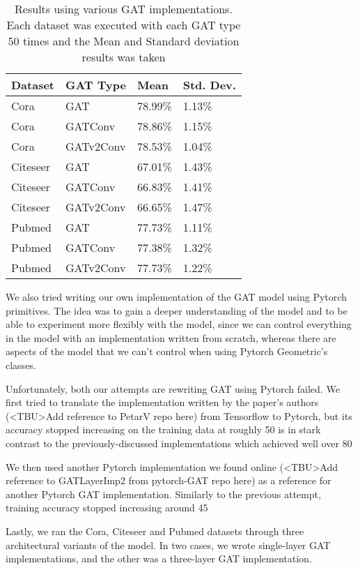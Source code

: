 \begin{table}
    \centering
    \begin{tabular}{@{}llll@{}}
        \toprule
        \textbf{Dataset} & \textbf{GAT Type} & \textbf{Mean} & \textbf{Std. Dev.}\\
        \midrule
        Cora             &  {GAT}            &  {78.99}\%      & {1.13}\%             \\
        Cora             &  {GATConv}        &  {78.86}\%      & {1.15}\%             \\
        Cora             &  {GATv2Conv}      &  {78.53}\%      & {1.04}\%             \\
        Citeseer         &  {GAT}            &  {67.01}\%      & {1.43}\%             \\
        Citeseer         &  {GATConv}        &  {66.83}\%      & {1.41}\%             \\
        Citeseer         &  {GATv2Conv}      &  {66.65}\%      & {1.47}\%             \\
        Pubmed           &  {GAT}            &  {77.73}\%      & {1.11}\%             \\
        Pubmed           &  {GATConv}        &  {77.38}\%      & {1.32}\%             \\
        Pubmed           &  {GATv2Conv}      &  {77.73}\%      & {1.22}\%             \\
        \bottomrule

    \end{tabular}
    \caption{Results using various GAT implementations. Each dataset was executed with each GAT type 50 times
    and the Mean and Standard deviation results was taken}
    \label{tab:results-table}
\end{table}

We also tried writing our own implementation of the GAT model using Pytorch
primitives. The idea was to gain a deeper understanding of the model and to be
able to experiment more flexibly with the model, since we can control
everything in the model with an implementation written from scratch, whereas
there are aspects of the model that we can't control when using Pytorch
Geometric's classes.

Unfortunately, both our attempts are rewriting GAT using Pytorch failed. We
first tried to translate the implementation written by the paper's authors
(<TBU>Add reference to PetarV repo here) from Tensorflow to Pytorch, but its
accuracy stopped increasing on the training data at roughly 50%
is in stark contrast to the previously-discussed implementations which achieved
well over 80%

We then used another Pytorch implementation we found online (<TBU>Add reference
to GATLayerImp2 from pytorch-GAT repo here) as a reference for another Pytorch
GAT implementation. Similarly to the previous attempt, training accuracy
stopped increasing around 45%

Lastly, we ran the Cora, Citeseer and Pubmed datasets through three
architectural variants of the model. In two cases, we wrote single-layer
GAT implementations, and the other was a three-layer GAT implementation.
